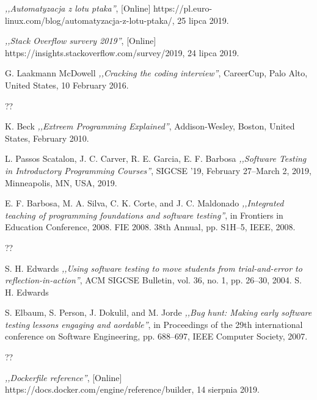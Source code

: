 \begin{thebibliography}{99}
 \emph{,,Automatyzacja z lotu ptaka''}, [Online] https://pl.euro-linux.com/blog/automatyzacja-z-lotu-ptaka/, 25 lipca 2019.

 \emph{,,Stack Overflow survery 2019''}, [Online] https://insights.stackoverflow.com/survey/2019, 24 lipca 2019.

 G. Laakmann McDowell \emph{,,Cracking the coding interview''}, CareerCup, Palo Alto, United States, 10 February 2016.

 ??

 K. Beck \emph{,,Extreem Programming Explained''}, Addison-Wesley, Boston, United States, February 2010.

 L. Passos Scatalon, J. C. Carver, R. E. Garcia, E. F. Barbosa \emph{,,Software Testing in Introductory Programming Courses''}, SIGCSE '19, February 27–March 2, 2019, Minneapolis, MN, USA, 2019.

 E. F. Barbosa, M. A. Silva, C. K. Corte, and J. C. Maldonado \emph{,,Integrated teaching of programming foundations and software testing''}, in Frontiers in Education Conference, 2008. FIE 2008. 38th Annual, pp. S1H–5, IEEE, 2008.

 ??


 S. H. Edwards  \emph{,,Using software testing to move students from trial-and-error to reflection-in-action''}, ACM SIGCSE Bulletin, vol. 36, no. 1, pp. 26–30, 2004.
S. H. Edwards


 S. Elbaum, S. Person, J. Dokulil, and M. Jorde \emph{,,Bug hunt: Making early software testing lessons engaging and aordable''}, in Proceedings of the 29th international conference on Software Engineering, pp. 688–697, IEEE Computer Society, 2007.

 ??



  \emph{,,Dockerfile reference''}, [Online] https://docs.docker.com/engine/reference/builder, 14 sierpnia 2019.


\end{thebibliography}
